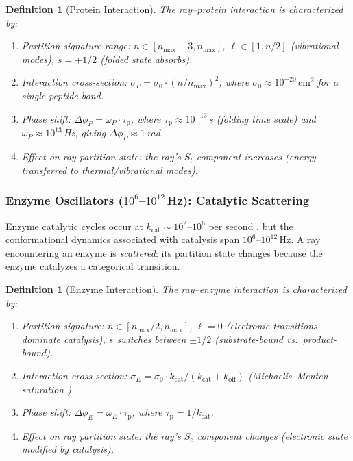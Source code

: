 \documentclass[11pt,twocolumn,a4paper]{article}
\newtheorem{definition}[theorem]{Definition}
\newcommand{\St}{S_t}
\newcommand{\Se}{S_e}
\newcommand{\taup}{\tau_{\mathrm{p}}}
\begin{document}
\begin{definition}[Protein Interaction]
\label{def:protein-interaction}
The ray--protein interaction is characterized by:
\begin{enumerate}[label=(\alph*),leftmargin=*]
\item \textit{Partition signature range:} $n \in [n_{\max}-3,
  n_{\max}]$, $\ell \in [1, n/2]$ (vibrational modes), $s = +1/2$
  (folded state absorbs).
\item \textit{Interaction cross-section:}
  $\sigma_P = \sigma_0 \cdot (n/n_{\max})^2$, where $\sigma_0 \approx
  10^{-20}\,\text{cm}^2$ for a single peptide bond.
\item \textit{Phase shift:} $\Delta\phi_P = \omega_P \cdot \taup$,
  where $\taup \approx 10^{-13}$\,s (folding time scale) and
  $\omega_P \approx 10^{13}$\,Hz, giving $\Delta\phi_P \approx 1$\,rad.
\item \textit{Effect on ray partition state:} the ray's $\St$ component
  increases (energy transferred to thermal/vibrational modes).
\end{enumerate}
\end{definition}

\subsubsection{Enzyme Oscillators ($10^{6}$--$10^{12}$\,Hz):
Catalytic Scattering}

Enzyme catalytic cycles occur at $k_{\mathrm{cat}} \sim 10^2$--$10^6$
per second \citep{fersht1999}, but the conformational dynamics
associated with catalysis span $10^6$--$10^{12}$\,Hz. A ray
encountering an enzyme is \emph{scattered}: its partition state
changes because the enzyme catalyzes a categorical transition.

\begin{definition}[Enzyme Interaction]
\label{def:enzyme-interaction}
The ray--enzyme interaction is characterized by:
\begin{enumerate}[label=(\alph*),leftmargin=*]
\item \textit{Partition signature:} $n \in [n_{\max}/2, n_{\max}]$,
  $\ell = 0$ (electronic transitions dominate catalysis), $s$ switches
  between $\pm 1/2$ (substrate-bound vs.\ product-bound).
\item \textit{Interaction cross-section:}
  $\sigma_E = \sigma_0 \cdot k_{\mathrm{cat}} /
  (k_{\mathrm{cat}} + k_{\mathrm{off}})$ (Michaelis--Menten
  saturation \citep{michaelismenten1913}).
\item \textit{Phase shift:}
  $\Delta\phi_E = \omega_E \cdot \taup$, where
  $\taup = 1/k_{\mathrm{cat}}$.
\item \textit{Effect on ray partition state:} the ray's $\Se$ component
  changes (electronic state modified by catalysis).
\end{enumerate}
\end{definition}
\end{document}
